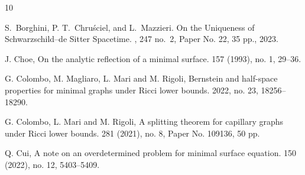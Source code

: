 \documentclass[10 pt,a4paper]{article}
\theoremstyle{definition}
\begin{document}
\begin{thebibliography}{10}


S.~Borghini, P. T.~Chru\'sciel, and L.~Mazzieri.
\newblock On the Uniqueness of Schwarzschild--de Sitter Spacetime.
, 247 no.~2, Paper No. 22, 35 pp., 2023.






J. Choe, 
\newblock On the analytic reflection of a minimal surface. 
 157 (1993), no. 1, 29--36.

G. Colombo, M. Magliaro, L. Mari and M. Rigoli, 
\newblock Bernstein and half-space properties for minimal graphs under Ricci lower bounds.
 2022, no. 23, 18256--18290.

G. Colombo, L. Mari and M. Rigoli, 
\newblock A splitting theorem for capillary graphs under Ricci lower bounds.
 281 (2021), no. 8, Paper No. 109136, 50 pp.


Q. Cui, 
\newblock A note on an overdetermined problem for minimal surface equation.
 150 (2022), no. 12, 5403--5409.



\end{thebibliography}
\end{document}
